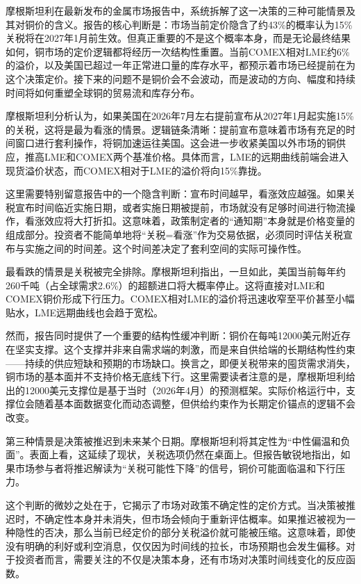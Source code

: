 \documentclass[11pt]{ctexart}
\begin{document}
摩根斯坦利在最新发布的金属市场报告中，系统拆解了这一决策的三种可能情景及其对铜价的含义。报告的核心判断是：市场当前定价隐含了约43\%的概率认为15\%关税将在2027年1月前生效。但真正重要的不是这个概率本身，而是无论最终结果如何，铜市场的定价逻辑都将经历一次结构性重置。当前COMEX相对LME约6\%的溢价，以及美国已超过一年正常进口量的库存水平，都预示着市场已经提前在为这个决策定价。接下来的问题不是铜价会不会波动，而是波动的方向、幅度和持续时间将如何重塑全球铜的贸易流和库存分布。

摩根斯坦利分析认为，如果美国在2026年7月左右提前宣布从2027年1月起实施15\%的关税，这将是最为看涨的情景。逻辑链条清晰：提前宣布意味着市场有充足的时间窗口进行套利操作，将铜加速运往美国。这会进一步收紧美国以外市场的铜供应，推高LME和COMEX两个基准价格。具体而言，LME的远期曲线前端会进入现货溢价状态，而COMEX相对于LME的溢价将向15\%靠拢。

这里需要特别留意报告中的一个隐含判断：宣布时间越早，看涨效应越强。如果关税宣布时间临近实施日期，或者实施日期被提前，市场就没有足够时间进行物流操作，看涨效应将大打折扣。这意味着，政策制定者的“通知期”本身就是价格变量的组成部分。投资者不能简单地将“关税=看涨”作为交易依据，必须同时评估关税宣布与实施之间的时间差。这个时间差决定了套利空间的实际可操作性。

最看跌的情景是关税被完全排除。摩根斯坦利指出，一旦如此，美国当前每年约260千吨（占全球需求2.6\%）的超额进口将大概率停止。这将直接对LME和COMEX铜价形成下行压力。COMEX相对LME的溢价将迅速收窄至平价甚至小幅贴水，LME远期曲线也会趋于宽松。

然而，报告同时提供了一个重要的结构性缓冲判断：铜价在每吨12000美元附近存在坚实支撑。这个支撑并非来自需求端的刺激，而是来自供给端的长期结构性约束——持续的供应短缺和预期的市场缺口。换言之，即便关税带来的囤货需求消失，铜市场的基本面并不支持价格无底线下行。这里需要读者注意的是，摩根斯坦利给出的12000美元支撑位是基于当时（2026年4月）的预测框架。实际价格运行中，支撑位会随着基本面数据变化而动态调整，但供给约束作为长期定价锚点的逻辑不会改变。

第三种情景是决策被推迟到未来某个日期。摩根斯坦利将其定性为“中性偏温和负面”。表面上看，这延续了现状，关税选项仍然在桌面上。但报告敏锐地指出，如果市场参与者将推迟解读为“关税可能性下降”的信号，铜价可能面临温和下行压力。

这个判断的微妙之处在于，它揭示了市场对政策不确定性的定价方式。当决策被推迟时，不确定性本身并未消失，但市场会倾向于重新评估概率。如果推迟被视为一种隐性的否决，那么当前已经定价的部分关税溢价就可能被压缩。这意味着，即使没有明确的利好或利空消息，仅仅因为时间线的拉长，市场预期也会发生偏移。对于投资者而言，需要关注的不仅是决策本身，还有市场对决策时间线变化的反应函数。
\end{document}
